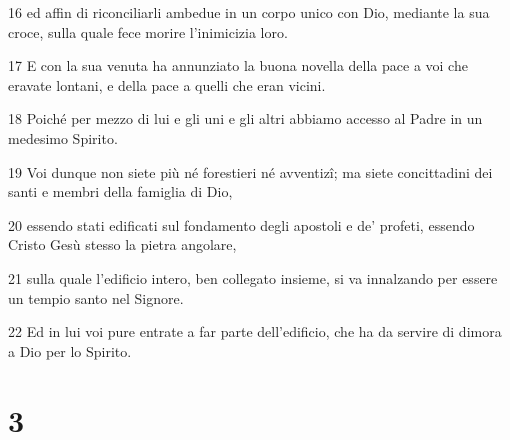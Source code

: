 \par 16 ed affin di riconciliarli ambedue in un corpo unico con Dio, mediante la sua croce, sulla quale fece morire l'inimicizia loro.
\par 17 E con la sua venuta ha annunziato la buona novella della pace a voi che eravate lontani, e della pace a quelli che eran vicini.
\par 18 Poiché per mezzo di lui e gli uni e gli altri abbiamo accesso al Padre in un medesimo Spirito.
\par 19 Voi dunque non siete più né forestieri né avventizî; ma siete concittadini dei santi e membri della famiglia di Dio,
\par 20 essendo stati edificati sul fondamento degli apostoli e de' profeti, essendo Cristo Gesù stesso la pietra angolare,
\par 21 sulla quale l'edificio intero, ben collegato insieme, si va innalzando per essere un tempio santo nel Signore.
\par 22 Ed in lui voi pure entrate a far parte dell'edificio, che ha da servire di dimora a Dio per lo Spirito.

\chapter{3}


